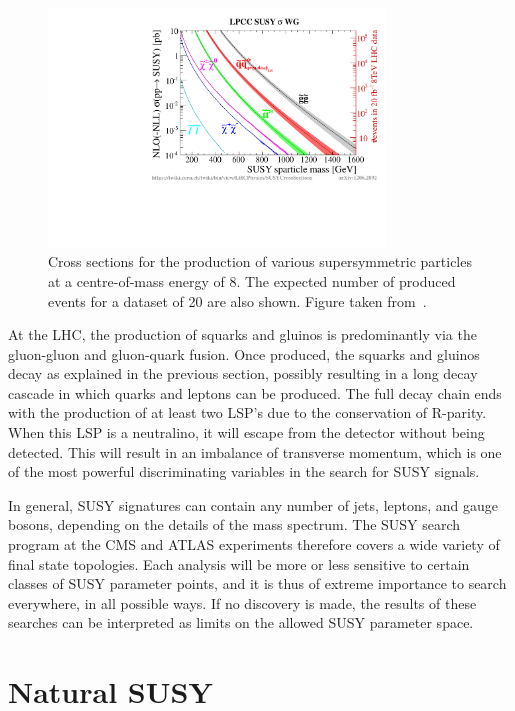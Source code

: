 \begin{figure}
  \centering
  \includegraphics[width=0.8\textwidth]{figures/susy/xsections_strong}
  \caption{Cross sections for the production of various supersymmetric particles at a
centre-of-mass energy of 8\TeV. The expected number of produced events for a dataset of 20\fbinv
are also shown. Figure taken from~\cite{Kramer:2012bx}.
  \label{fig:susy_cross_sections}}
\end{figure}

At the LHC, the production of squarks and gluinos is predominantly via the gluon-gluon and
gluon-quark fusion. Once produced, the squarks and gluinos decay as explained in the previous
section, possibly resulting in a
long decay cascade in which quarks and leptons can be produced. The full decay chain ends with
the production of at least two LSP's due to the conservation of R-parity. 
When this LSP is a neutralino, it will escape from the detector without being detected. This
will result in an imbalance of transverse momentum, which is one of the most powerful
discriminating variables in the search for SUSY signals. 

In general, SUSY signatures can contain any number of jets, leptons, and gauge bosons, depending on
the details of the mass spectrum. The SUSY search program at the CMS and ATLAS experiments therefore
covers a wide variety of final state topologies. Each analysis will be more or less sensitive to
certain classes of SUSY parameter points, and it is thus of extreme importance to search everywhere,
in all possible ways. If no discovery is made, the results of these searches can be interpreted as
limits on the allowed SUSY parameter space. 





\section{Natural SUSY \label{sec:susy_natural_susy}}


